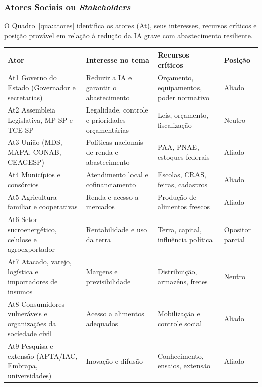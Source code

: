 \documentclass[
	12pt,				%
	openright,			%
	oneside,			%
	a4paper,			%
	chapter=TITLE,		%
	section=TITLE,		%
	english,			%
	french,				%
	spanish,			%
	brazil,				%
 ]{abntex2}
\begin{document}
\subsubsection{Atores Sociais ou \textit{Stakeholders}}
O Quadro~\ref{qua:atores} identifica os atores (At), seus interesses, recursos
críticos e posição provável em relação à redução da IA grave com abastecimento
resiliente.

\begin{quadro}[!htbp]
\centering
\caption{Atores sociais: interesses, recursos críticos e posição}
\label{qua:atores}
\footnotesize
\renewcommand{\arraystretch}{1.05}
\setlength{\tabcolsep}{3pt}
\begin{tabularx}{\textwidth}{|>{\raggedright\arraybackslash}p{3.3cm}|>{\raggedright\arraybackslash}X|>{\raggedright\arraybackslash}p{3.3cm}|>{\centering\arraybackslash}p{1.75cm}|}
\hline
\textbf{Ator} & \textbf{Interesse no tema} & \textbf{Recursos críticos} & \textbf{Posição} \\
\hline
At1 Governo do Estado (Governador e secretarias) & Reduzir a IA e garantir o abastecimento & Orçamento, equipamentos, poder normativo & Aliado \\
\hline
At2 Assembleia Legislativa, MP-SP e TCE-SP & Legalidade, controle e prioridades orçamentárias & Leis, orçamento, fiscalização & Neutro \\
\hline
At3 União (MDS, MAPA, CONAB, CEAGESP) & Políticas nacionais de renda e abastecimento & PAA, PNAE, estoques federais & Aliado \\
\hline
At4 Municípios e consórcios & Atendimento local e cofinanciamento & Escolas, CRAS, feiras, cadastros & Aliado \\
\hline
At5 Agricultura familiar e cooperativas & Renda e acesso a mercados & Produção de alimentos frescos & Aliado \\
\hline
At6 Setor sucroenergético, celulose e agroexportador & Rentabilidade e uso da terra & Terra, capital, influência política & Opositor parcial \\
\hline
At7 Atacado, varejo, logística e importadores de insumos & Margens e previsibilidade & Distribuição, armazéns, fretes & Neutro \\
\hline
At8 Consumidores vulneráveis e organizações da sociedade civil & Acesso a alimentos adequados & Mobilização e controle social & Aliado \\
\hline
At9 Pesquisa e extensão (APTA/IAC, Embrapa, universidades) & Inovação e difusão & Conhecimento, ensaios, extensão & Aliado \\

\end{tabularx}
\end{quadro}
\end{document}
